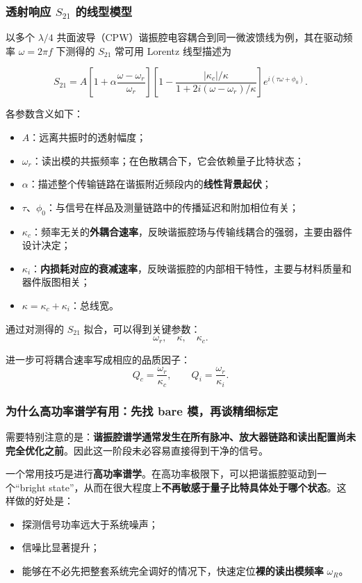 \documentclass[12pt,a4paper,oneside]{ctexbook}
\begin{document}
\subsubsection{透射响应 \(S_{21}\) 的线型模型}

以多个 \(\lambda/4\) 共面波导（CPW）谐振腔电容耦合到同一微波馈线为例，其在驱动频率 \(\omega = 2\pi f\) 下测得的 \(S_{21}\) 常可用 Lorentz 线型描述为

\begin{equation}
S_{21}
=
A\left[1+\alpha\frac{\omega-\omega_r}{\omega_r}\right]
\left[
1-\frac{|\kappa_c|/\kappa}{1+2i(\omega-\omega_r)/\kappa}
\right]
e^{i(\tau \omega+\phi_0)}.
\tag{51}
\end{equation}

各参数含义如下：
\begin{itemize}
    \item \(A\)：远离共振时的透射幅度；
    \item \(\omega_r\)：读出模的共振频率；在色散耦合下，它会依赖量子比特状态；
    \item \(\alpha\)：描述整个传输链路在谐振附近频段内的\textbf{线性背景起伏}；
    \item \(\tau\)、\(\phi_0\)：与信号在样品及测量链路中的传播延迟和附加相位有关；
    \item \(\kappa_c\)：频率无关的\textbf{外耦合速率}，反映谐振腔场与传输线耦合的强弱，主要由器件设计决定；
    \item \(\kappa_i\)：\textbf{内损耗对应的衰减速率}，反映谐振腔的内部相干特性，主要与材料质量和器件版图相关；
    \item \(\kappa = \kappa_c+\kappa_i\)：总线宽。
\end{itemize}

通过对测得的 \(S_{21}\) 拟合，可以得到关键参数：
\[
\omega_r,\quad \kappa,\quad \kappa_c.
\]

进一步可将耦合速率写成相应的品质因子：
\[
Q_c=\frac{\omega_r}{\kappa_c},\qquad
Q_i=\frac{\omega_r}{\kappa_i}.
\]

\subsubsection{为什么高功率谱学有用：先找 bare 模，再谈精细标定}

需要特别注意的是：\textbf{谐振腔谱学通常发生在所有脉冲、放大器链路和读出配置尚未完全优化之前}。因此这一阶段未必容易直接得到干净的信号。

一个常用技巧是进行\textbf{高功率谱学}。在高功率极限下，可以把谐振腔驱动到一个“bright state”，从而在很大程度上\textbf{不再敏感于量子比特具体处于哪个状态}。这样做的好处是：
\begin{itemize}
    \item 探测信号功率远大于系统噪声；
    \item 信噪比显著提升；
    \item 能够在不必先把整套系统完全调好的情况下，快速定位\textbf{裸的读出模频率} \(\omega_R\)。
\end{itemize}
\end{document}
